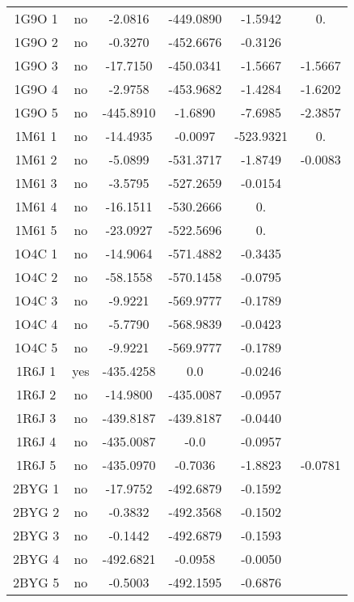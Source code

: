 \begin{table}[h]
\begin{tabular}{cccccc}
        1G9O 1 & no & -2.0816    &    -449.0890 & -1.5942 & 0. \\               
        1G9O 2 & no & -0.3270    &    -452.6676 & -0.3126 & \\          
        1G9O 3 & no & -17.7150   &    -450.0341 & -1.5667 & -1.5667 \\         
        1G9O 4 & no & -2.9758    &    -453.9682 & -1.4284 & -1.6202 \\          
        1G9O 5 & no & -445.8910  &    -1.6890 & -7.6985 & -2.3857 \\          
        1M61 1 & no & -14.4935   &    -0.0097 & -523.9321 & 0. \\            
        1M61 2 & no & -5.0899    &    -531.3717 & -1.8749 & -0.0083 \\         
        1M61 3 & no & -3.5795    &    -527.2659 & -0.0154 & \\           
        1M61 4 & no & -16.1511   &    -530.2666 & 0. & \\              
        1M61 5 & no & -23.0927   &    -522.5696 & 0. & \\                 
        1O4C 1 & no & -14.9064   &    -571.4882 & -0.3435 & \\         
        1O4C 2 & no & -58.1558   &    -570.1458 & -0.0795 & \\         
        1O4C 3 & no & -9.9221    &    -569.9777 & -0.1789 & \\          
        1O4C 4 & no & -5.7790    &    -568.9839 & -0.0423 & \\          
        1O4C 5 & no & -9.9221    &    -569.9777 & -0.1789 & \\          
        1R6J 1 & yes& -435.4258  &     0.0 & -0.0246 & \\               
        1R6J 2 & no & -14.9800   &    -435.0087 & -0.0957 & \\         
        1R6J 3 & no & -439.8187  &    -439.8187 & -0.0440 & \\               
        1R6J 4 & no &  -435.0087  &    -0.0 & -0.0957 & \\               
        1R6J 5 & no & -435.0970  &    -0.7036 & -1.8823 & -0.0781 \\          
        2BYG 1 & no & -17.9752   &    -492.6879 & -0.1592 & \\         
        2BYG 2 & no & -0.3832    &    -492.3568 & -0.1502 & \\          
        2BYG 3 & no & -0.1442    &    -492.6879 & -0.1593 & \\          
        2BYG 4 & no & -492.6821 &    -0.0958 & -0.0050 & \\          
        2BYG 5 & no & -0.5003    &   -492.1595 & -0.6876 & \\           
       \bottomrule


 \end{tabular}      
\label{tab:result_echec_30}      
\end{table}

